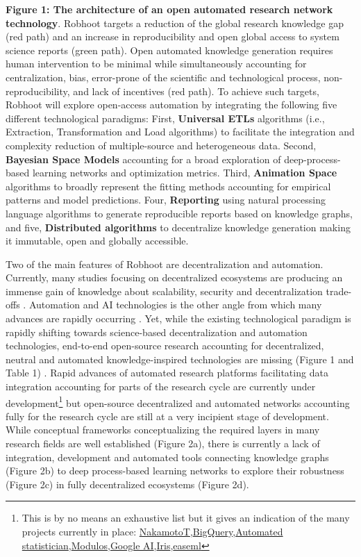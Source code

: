 \documentclass[10pt, a4paper, twocolumn]{article} %
\begin{document}
{{\small {\bf Figure 1: The architecture of an open automated research
    network technology}. Robhoot targets a reduction of the global
  research knowledge gap (red path) and an increase in reproducibility
  and open global access to system science reports (green path). Open
  automated knowledge generation requires human intervention to be
  minimal while simultaneously accounting for centralization, bias,
  error-prone of the scientific and technological process,
  non-reproducibility, and lack of incentives (red path). To achieve
  such targets, Robhoot will explore open-access automation by
  integrating the following five different technological paradigms:
  First, {\bf Universal ETLs} algorithms (i.e., Extraction,
  Transformation and Load algorithms) to facilitate the integration
  and complexity reduction of multiple-source and heterogeneous
  data. Second, {\bf Bayesian Space Models} accounting for a broad
  exploration of deep-process-based learning networks and optimization
  metrics. Third, {\bf Animation Space} algorithms to broadly
  represent the fitting methods accounting for empirical patterns and
  model predictions. Four, {\bf Reporting} using natural processing
  language algorithms to generate reproducible reports based on
  knowledge graphs, and five, {\bf Distributed algorithms} to
  decentralize knowledge generation making it immutable, open and
  globally accessible.}

Two of the main features of Robhoot are decentralization and
automation. Currently, many studies focusing on decentralized
ecosystems are producing an immense gain of knowledge about
scalability, security and decentralization trade-offs
\citep{Golem2016,Durov2017,Androulaki2018,OceanProtocolFoundation2018,BigchainDBGmbH2018}. Automation
and AI technologies is the other angle from which many advances are
rapidly occurring \citep{Schmidhuber:2015,Reichstein,Gil2019}. Yet,
while the existing technological paradigm is rapidly shifting towards
science-based decentralization and automation technologies, end-to-end
open-source research accounting for decentralized, neutral and
automated knowledge-inspired technologies are missing (Figure 1 and
Table 1) \citep{Gunther2018}. Rapid advances of automated research
platforms facilitating data integration accounting for parts of the
research cycle are currently under development\footnote{This is by no
  means an exhaustive list but it gives an indication of the many
  projects currently in place:
  \href{https://www.nterminal.com}{NakamotoT},\href{https://cloud.google.com/bigquery/}{BigQuery},\href{https://www.automaticstatistician.com/index/}{Automated
    statistician},\href{http://www.modulos.ai/}{Modulos},\href{https://ai.google/}{Google
    AI},\href{https://iris.ai}{Iris},\href{https://github.com/DS3Lab/easeml}{easeml}}
but open-source decentralized and automated networks accounting fully
for the research cycle are still at a very incipient stage of
development. While conceptual frameworks conceptualizing the required
layers in many research fields are well established (Figure 2a), there
is currently a lack of integration, development and automated tools
connecting knowledge graphs (Figure 2b) to deep process-based learning
networks to explore their robustness (Figure 2c) in fully
decentralized ecosystems (Figure 2d).

}
\end{document}
